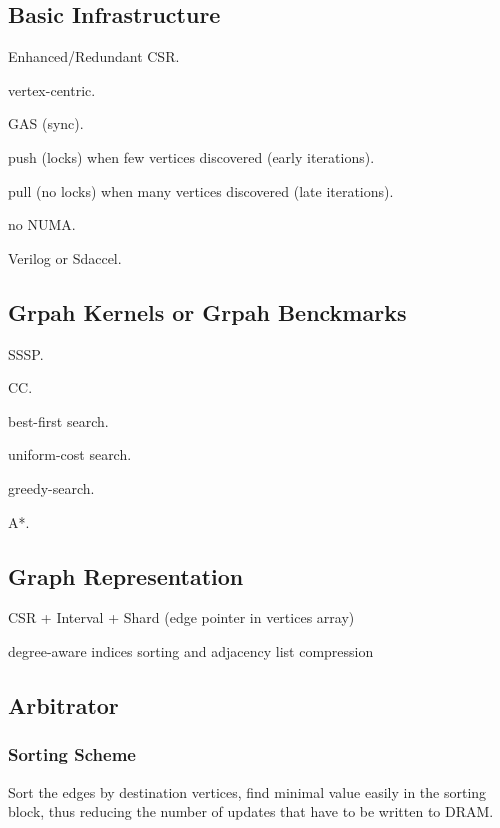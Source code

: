 \documentclass[UTF8,12pt,a4paper]{article}
\begin{document}
\subsection{Basic Infrastructure}
\begin{compactitem}
  \item Enhanced/Redundant CSR.
  \item vertex-centric.
  \item GAS (sync).
  \item push (locks) when few vertices discovered (early iterations).
  \item pull (no locks) when many vertices discovered (late iterations).
  \item no NUMA.
  \item Verilog or Sdaccel.
\end{compactitem}

\subsection{Grpah Kernels or Grpah Benckmarks}
\begin{compactitem}
  \item SSSP.
  \item CC.
  \item best-first search.
  \item uniform-cost search.
  \item greedy-search.
  \item A*.
\end{compactitem}

\subsection{Graph Representation}
\begin{compactitem}
  \item CSR + Interval + Shard (edge pointer in vertices array)~\cite{DBLP:conf/sbac-pad/ZhouP17}
  \item degree-aware indices sorting and adjacency list compression~\cite{DBLP:conf/fpga/ZhangL18}
\end{compactitem}

\subsection{Arbitrator} %
\label{sub:arbitrator}
\subsubsection{Sorting Scheme}
Sort the edges by destination vertices, find minimal value easily in the sorting block,
thus reducing the number of updates that have to be written to DRAM.
\end{document}
